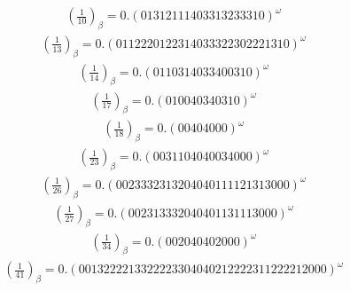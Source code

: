 \documentclass[fleqn]{article}
\begin{document}
\begin{equation*}
\begin{split}
(\frac{1}{10})_\beta = 0.(01312111403313233310)^\omega
\end{split}\end{equation*}
\begin{equation*}
\begin{split}
(\frac{1}{13})_\beta = 0.(0112220122314033322302221310)^\omega
\end{split}\end{equation*}
\begin{equation*}
\begin{split}
(\frac{1}{14})_\beta = 0.(0110314033400310)^\omega
\end{split}\end{equation*}
\begin{equation*}
\begin{split}
(\frac{1}{17})_\beta = 0.(010040340310)^\omega
\end{split}\end{equation*}
\begin{equation*}
\begin{split}
(\frac{1}{18})_\beta = 0.(00404000)^\omega
\end{split}\end{equation*}
\begin{equation*}
\begin{split}
(\frac{1}{23})_\beta = 0.(0031104040034000)^\omega
\end{split}\end{equation*}
\begin{equation*}
\begin{split}
(\frac{1}{26})_\beta = 0.(0023332313204040111121313000)^\omega
\end{split}\end{equation*}
\begin{equation*}
\begin{split}
(\frac{1}{27})_\beta = 0.(002313332040401131113000)^\omega
\end{split}\end{equation*}
\begin{equation*}
\begin{split}
(\frac{1}{34})_\beta = 0.(002040402000)^\omega
\end{split}\end{equation*}
\begin{equation*}
\begin{split}
(\frac{1}{41})_\beta = 0.(0013222213322223304040212222311222212000)^\omega
\end{split}\end{equation*}
\end{document}
